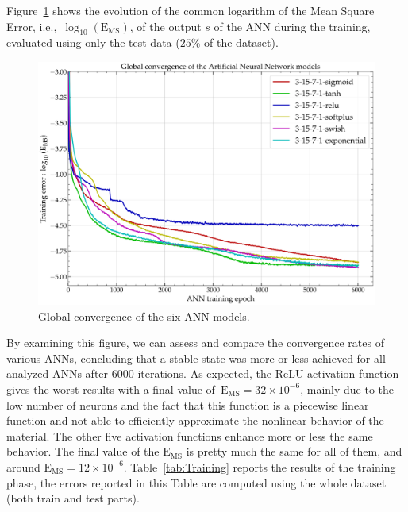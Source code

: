 \documentclass[algorithms,article,accept,pdftex,oneauthor]{Definitions/mdpi}
\makeatletter
\DeclareRobustCommand{\ie}{i.e.,\@\xspace}
\DeclareRobustCommand{\MSE}{\text{E}_\text{MS}}
\makeatother
\begin{document}
Figure~\ref{fig:ANN-conv} shows the evolution of the common logarithm of the Mean Square Error, \ie~$\log_{10}(\MSE)$, of the output $s$ of the ANN during the training, evaluated using only the test data ($25\%$ of the dataset).
\begin{figure}[H]
\includegraphics[width=0.7\columnwidth]{Figures/3Cr2Mo-convergence}
\caption{Global convergence of the six ANN models.}
\label{fig:ANN-conv}
\end{figure}
By examining this figure, we can assess and compare the convergence rates of various ANNs, concluding that a stable state was more-or-less achieved for all analyzed ANNs after $6000$ iterations.
As expected, the ReLU activation function gives the worst results with a final value of~$\MSE=32\times10^{-6}$, mainly due to the low number of neurons and the fact that this function is a piecewise linear function and not able to efficiently approximate the nonlinear behavior of the material.
The other five activation functions enhance more or less the same behavior.
The final value of the $\MSE$ is pretty much the same for all of them, and around $\MSE=12\times10^{-6}$.
Table~\ref{tab:Training} reports the results of the training phase, the errors reported in this Table are computed using the whole dataset (both train and test parts).
\end{document}

